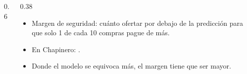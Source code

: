 \begin{frame}
  \begin{columns}[c]
    \begin{column}{0.6\textwidth}\centering
    \end{column}
    \begin{column}{0.38\textwidth}
      \begin{itemize}\footnotesize
        \item Margen de seguridad: cuánto ofertar por debajo de la predicción para que solo 1 de cada 10 compras pague de más.
        \item En Chapinero: \textbf{\margenchap}.
        \item Donde el modelo se equivoca más, el margen tiene que ser mayor.
      \end{itemize}
    \end{column}
  \end{columns}
\end{frame}

